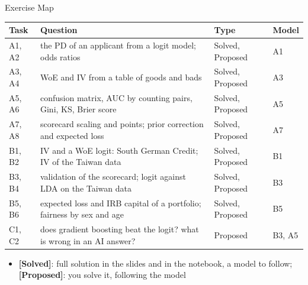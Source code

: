 \begin{frame}{Exercise Map}
\itemsize{\small}
\begin{center}
\footnotesize
\begin{tabular}{>{\raggedright\arraybackslash}p{1.1cm}>{\raggedright\arraybackslash}p{7.5cm}>{\raggedright\arraybackslash}p{1.9cm}>{\raggedright\arraybackslash}p{1.4cm}}
\toprule
\textbf{Task} & \textbf{Question} & \textbf{Type} & \textbf{Model} \\
\midrule
A1, A2 & the PD of an applicant from a logit model; odds ratios & Solved, Proposed & A1 \\
A3, A4 & WoE and IV from a table of goods and bads & Solved, Proposed & A3 \\
A5, A6 & confusion matrix, AUC by counting pairs, Gini, KS, Brier score & Solved, Proposed & A5 \\
A7, A8 & scorecard scaling and points; prior correction and expected loss & Solved, Proposed & A7 \\
B1, B2 & IV and a WoE logit: South German Credit; IV of the Taiwan data & Solved, Proposed & B1 \\
B3, B4 & validation of the scorecard; logit against LDA on the Taiwan data & Solved, Proposed & B3 \\
B5, B6 & expected loss and IRB capital of a portfolio; fairness by sex and age & Solved, Proposed & B5 \\
C1, C2 & does gradient boosting beat the logit? what is wrong in an AI answer? & Proposed & B3, A5 \\
\bottomrule
\end{tabular}
\end{center}
\begin{itemize}
    \item \textbf{[Solved]}: full solution in the slides and in the notebook, a model to follow; \textbf{[Proposed]}: you solve it, following the model
\end{itemize}
\end{frame}

